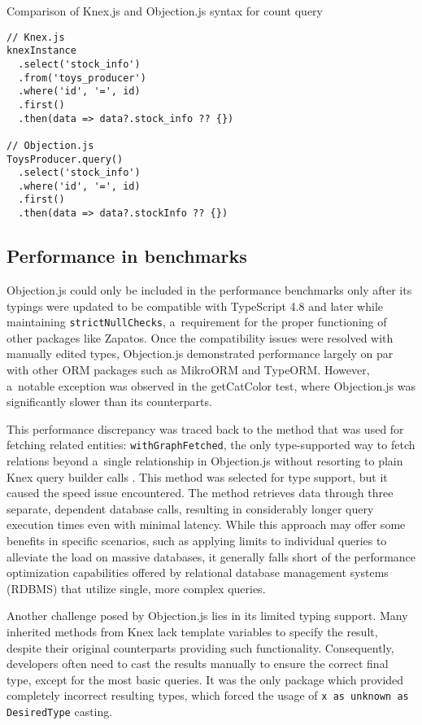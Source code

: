\begin{listing}
\caption{Comparison of Knex.js and Objection.js syntax for count query}
\label{lst:knexObjection}
\begin{verbatim}
// Knex.js
knexInstance
  .select('stock_info')
  .from('toys_producer')
  .where('id', '=', id)
  .first()
  .then(data => data?.stock_info ?? {})

// Objection.js
ToysProducer.query()
  .select('stock_info')
  .where('id', '=', id)
  .first()
  .then(data => data?.stockInfo ?? {})
\end{verbatim}
\end{listing}

\subsection*{Performance in benchmarks}

Objection.js could only be included in the performance benchmarks only after its
typings were updated to be compatible with TypeScript 4.8 and later while
maintaining \texttt{strictNullChecks}, a~requirement for the proper functioning
of other packages like Zapatos. Once the compatibility issues were resolved with
manually edited types, Objection.js demonstrated performance largely on par with
other ORM packages such as MikroORM and TypeORM. However, a~notable exception
was observed in the getCatColor test, where Objection.js was significantly
slower than its counterparts.

This performance discrepancy was traced back to the method that was used for
fetching related entities: \texttt{withGraphFetched}, the only type-supported
way to fetch relations beyond a~single relationship in Objection.js without
resorting to plain Knex query builder calls \cite{objectionDocs}. This method
was selected for type support, but it caused the speed issue encountered. The
method retrieves data through three separate, dependent database calls,
resulting in considerably longer query execution times even with minimal
latency. While this approach may offer some benefits in specific scenarios, such
as applying limits to individual queries to alleviate the load on massive
databases, it generally falls short of the performance optimization capabilities
offered by relational database management systems (RDBMS) that utilize single,
more complex queries.

Another challenge posed by Objection.js lies in its limited typing support. Many
inherited methods from Knex lack template variables to specify the result,
despite their original counterparts providing such functionality. Consequently,
developers often need to cast the results manually to ensure the correct final
type, except for the most basic queries. It was the only package which provided
completely incorrect resulting types, which forced the usage of \texttt{x as
unknown as DesiredType} casting.

